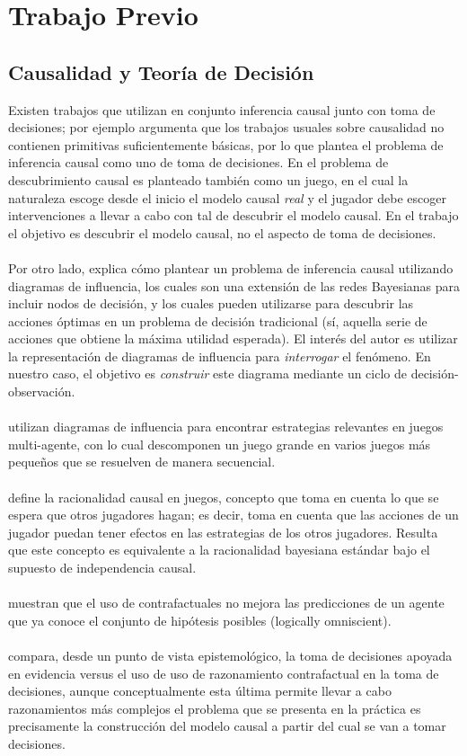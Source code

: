 \documentclass[11pt]{article}
\theoremstyle{plain}
\begin{document}
\section{Trabajo Previo}
\subsection{Causalidad y Teoría de Decisión}
Existen trabajos que utilizan en conjunto inferencia causal junto con toma de decisiones; por ejemplo \cite{heckerman1995decision} argumenta que los trabajos usuales sobre causalidad no contienen primitivas suficientemente básicas, por lo que plantea el problema de inferencia causal como uno de toma de decisiones. En \cite{eberhardt2008causal} el problema de descubrimiento causal es planteado también como un juego, en el cual la naturaleza escoge desde el inicio el modelo causal \textit{real} y el jugador debe escoger intervenciones a llevar a cabo con tal de descubrir el modelo causal. En el trabajo \cite{eberhardt2008causal} el objetivo es descubrir el modelo causal, no el aspecto de toma de decisiones.\\
\\
\indent Por otro lado, \cite{dawid2002influence} explica cómo plantear un problema de inferencia causal utilizando diagramas de influencia, los cuales son una extensión de las redes Bayesianas para incluir nodos de decisión, y los cuales pueden utilizarse para descubrir las acciones óptimas en un problema de decisión tradicional (sí, aquella serie de acciones que obtiene la máxima utilidad esperada). El interés del autor es utilizar la representación de diagramas de influencia para \textit{interrogar} el fenómeno. En nuestro caso, el objetivo es \textit{construir} este diagrama mediante un ciclo de decisión-observación.\\
\\
\indent \cite{koller2003multi} utilizan diagramas de influencia para encontrar estrategias relevantes en juegos multi-agente, con lo cual descomponen un juego grande en varios juegos más pequeños que se resuelven de manera secuencial.\\
\\
\indent \cite{board2006equivalence} define la racionalidad causal en juegos, concepto que toma en cuenta lo que se espera que otros jugadores hagan; es decir, toma en cuenta que las acciones de un jugador puedan tener efectos en las estrategias de los otros jugadores. Resulta que este concepto es equivalente a la racionalidad bayesiana estándar bajo el supuesto de independencia causal.\\
\\
\cite{di2013predictive} muestran que el uso de contrafactuales no mejora las predicciones de un agente que ya conoce el conjunto de hipótesis posibles (logically omniscient).\\
\\
\indent \cite{soares2015toward} compara, desde un punto de vista epistemológico, la toma de decisiones apoyada en evidencia versus el uso de uso de razonamiento contrafactual en la toma de decisiones, aunque conceptualmente esta última permite llevar a cabo razonamientos más complejos el problema que se presenta en la práctica es precisamente la construcción del modelo causal a partir del cual se van a tomar decisiones.
\end{document}
